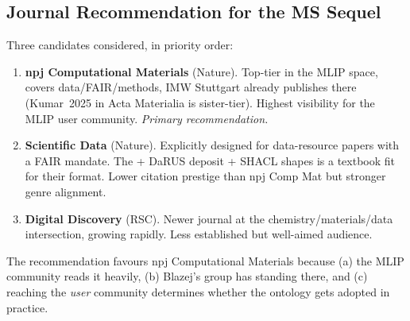\subsection{Journal Recommendation for the MS Sequel}

Three candidates considered, in priority order:

\begin{enumerate}
\item \textbf{npj Computational Materials} (Nature). Top-tier in the
  MLIP space, covers data/FAIR/methods, IMW Stuttgart already
  publishes there (Kumar~2025 in Acta Materialia is sister-tier).
  Highest visibility for the MLIP user community. \emph{Primary
  recommendation.}
\item \textbf{Scientific Data} (Nature). Explicitly designed for
  data-resource papers with a FAIR mandate. The \MLIPsOntology{} +
  DaRUS deposit + SHACL shapes is a textbook fit for their format.
  Lower citation prestige than npj Comp Mat but stronger genre
  alignment.
\item \textbf{Digital Discovery} (RSC). Newer journal at the
  chemistry/materials/data intersection, growing rapidly. Less
  established but well-aimed audience.
\end{enumerate}

The recommendation favours npj Computational Materials because (a) the
MLIP community reads it heavily, (b) Blazej's group has standing
there, and (c) reaching the \emph{user} community determines whether
the ontology gets adopted in practice.

